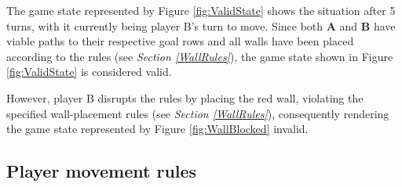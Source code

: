 The game state represented by Figure \ref{fig:ValidState} shows the situation after 5 turns, with it currently
being player B's turn to move. Since both \textbf{A} and \textbf{B} have viable paths to their respective goal
rows and all walls have been placed according to the rules (see \textit{Section \ref{WallRules}}),
the game state shown in Figure \ref{fig:ValidState} is considered valid.
\par
However, player B disrupts the rules by placing the red wall, violating the specified wall-placement rules
(see \textit{Section \ref{WallRules}}), consequently rendering the game state represented by
Figure \ref{fig:WallBlocked} invalid.

\subsection{Player movement rules}
\label{PlayerMoveRules}
